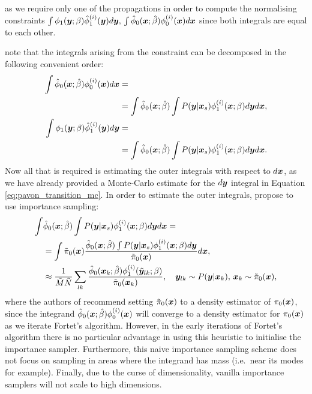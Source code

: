 \documentclass[a4paper,12pt,twoside,openright]{report}
\theoremstyle{definition}
\begin{document}
as we require only one of the propagations in order to compute the normalising constraints  $\int \phi_1({\bm{y}}; {\beta} )   {\hat{\phi}}_1^{(i)}({\bm{y}}) d{\bm{y}} , \, \int {\hat{\phi}}_0({\bm{x}}; \hat{\beta} )   \phi_0^{(i)}({\bm{x}}) d{\bm{x}} $ since both integrals are equal to each other.

\cite{pavon2018data} note that the integrals arising from the constraint can be decomposed in the following convenient order:
\begin{align}
\int {\hat{\phi}}_0({\bm{x}}; \hat{\beta} )   \phi_0^{(i)}({\bm{x}}) d{\bm{x}} &=\nonumber\\
& = \int  {\hat{\phi}}_0({\bm{x}}; \hat{\beta} ) \int P({\bm{y}}| {\bm{x}}_s) \phi_1^{(i)}({\bm{x}}; \beta) d{\bm{y}} d{\bm{x}}, \\
    \int \phi_1({\bm{y}}; {\beta} )   {\hat{\phi}}_1^{(i)}({\bm{y}}) d{\bm{y}} &=\nonumber\\
    &=\int  {\hat{\phi}}_0({\bm{x}}; \hat{\beta} ) \int P({\bm{y}}| {\bm{x}}_s) \phi_1^{(i)}({\bm{x}}; \beta) d{\bm{y}} d{\bm{x}}.
\end{align}
Now all that is required is estimating the outer integrals with respect to $d{\bm{x}}$, as we have already provided a Monte-Carlo estimate for the $d{\bm{y}}$ integral in Equation \ref{eq:pavon_transition_mc}. In order to estimate the outer integrals,  \cite{pavon2018data} propose to use importance sampling:
\begin{align}
    \int&  {\hat{\phi}}_0({\bm{x}}; \hat{\beta} ) \int P({\bm{y}}| {\bm{x}}_s) \phi_1^{(i)}({\bm{x}}; \beta) d{\bm{y}} d{\bm{x}} = \nonumber \\
    & = \int \tilde{\pi}_0({\bm{x}}) \frac{{\hat{\phi}}_0({\bm{x}}; \hat{\beta} ) \int P({\bm{y}}| {\bm{x}}_s) \phi_1^{(i)}({\bm{x}}; \beta) d{\bm{y}}}{\tilde{\pi}_0({\bm{x}})} d{\bm{x}}, \nonumber \\ 
     &\approx  \frac{1}{\tilde{M}\tilde{N}}\sum_{lk} \frac{{\hat{\phi}}_0({\bm{x}}_k; \hat{\beta} )\phi_1^{(i)}(\tilde{{\bm{y}}}_{lk}; \beta) }{\tilde{\pi}_0({\bm{x}}_k)} ,  \quad {\bm{y}}_{lk} \sim   P({\bm{y}}| {\bm{x}}_k), \, {\bm{x}}_k\sim\tilde{\pi}_0({\bm{x}}),
\end{align}
where the authors of \cite{pavon2018data} recommend  setting  $\tilde{\pi}_0({\bm{x}})$ to a density estimator of $\pi_0({\bm{x}})$, since the integrand  ${\hat{\phi}}_0({\bm{x}}; \hat{\beta} )\phi_0^{(i)}({\bm{x}})$ will converge  to a density estimator for $\pi_0({\bm{x}})$ as we iterate Fortet's algorithm. However, in the early iterations of Fortet's algorithm there is no particular advantage in using this heuristic to initialise the importance sampler. Furthermore, this naive importance sampling scheme does not focus on sampling in areas where the integrand has mass (i.e.\ near its modes for example). Finally, due to the curse of dimensionality, vanilla importance samplers will not scale to high dimensions. %
\end{document}
